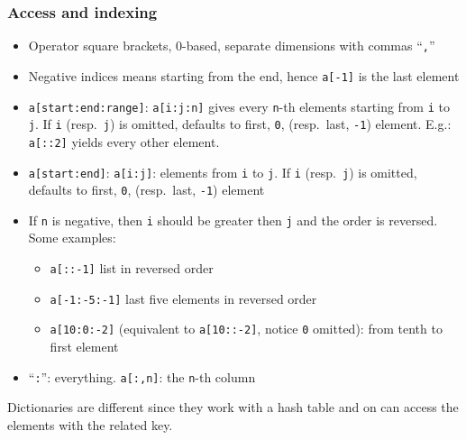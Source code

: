 \documentclass[a4paper,12pt,%
              final%
              ]{article}
\begin{document}
\subsubsection{Access and indexing}
\begin{itemize}
  \item Operator square brackets, 0-based, separate dimensions with commas ``\texttt{,}''
  \item Negative indices means starting from the end, hence \texttt{a[-1]} is the last element
  \item \verb|a[start:end:range]|: \verb|a[i:j:n]| gives every \texttt{n}-th elements starting from \texttt{i} to \texttt{j}. If \texttt{i} (resp.\ \texttt{j}) is omitted, defaults to first, \texttt{0}, (resp.\ last, \texttt{-1}) element. E.g.: \verb|a[::2]| yields every other element.
  \item \verb|a[start:end]|: \verb|a[i:j]|: elements from \texttt{i} to \texttt{j}. If \texttt{i} (resp.\ \texttt{j}) is omitted, defaults to first, \texttt{0}, (resp.\ last, \texttt{-1}) element
  \item If \texttt{n} is negative, then \texttt{i} should be greater then \texttt{j} and the order is reversed. Some examples:
    \begin{itemize}
      \item \verb|a[::-1]| list in reversed order
      \item \verb|a[-1:-5:-1]| last five elements in reversed order
      \item \verb|a[10:0:-2]| (equivalent to \verb|a[10::-2]|, notice \texttt{0} omitted): from tenth to first element
    \end{itemize}
  \item ``\verb|:|'': everything. \verb|a[:,n]|: the \texttt{n}-th column
\end{itemize}

Dictionaries are different since they work with a hash table and on can access the elements with the related key.
\end{document}
